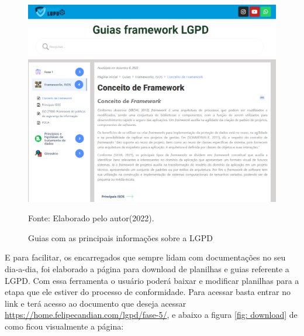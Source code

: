 \documentclass[
	12pt,				%
	openright,			%
	oneside,			%
	a4paper,			%
	english,			%
	french,				%
	spanish,			%
	brazil,				%
	]{abntex2}
\begin{document}
\begin{figure}[ht]
    \centering
    \caption{Guias com as principais informações sobre a LGPD}
    \includegraphics[width=6.0in]{Images/faseglossario.png}
    \label{fig: guiaframe}
    
    \centering \small Fonte: Elaborado pelo autor(2022).
\end{figure}

E para facilitar, os encarregados que sempre lidam com documentações no seu dia-a-dia, foi elaborado a página para download de planilhas e guias referente a LGPD. Com essa ferramenta o usuário poderá baixar e modificar planilhas para a etapa que ele estiver do processo de conformidade. Para acessar basta entrar no link e terá acesso ao documento que deseja acessar \url{https://home.felipecandian.com/lgpd/fase-5/}, e abaixo a figura \ref{fig: download} de como ficou visualmente a página:
\end{document}
